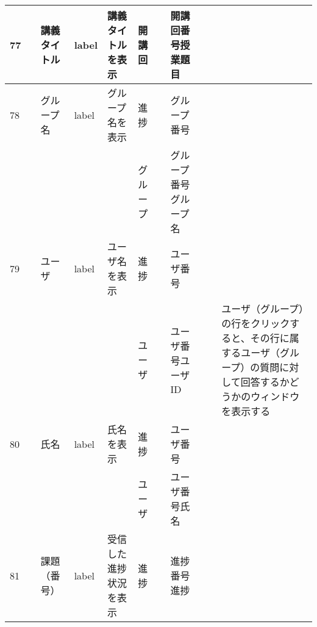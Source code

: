 \begin{landscape}
\begin{table}[]
\begin{tabular}{|l|l|l|l|l|l|l|l|l|l|l|}
77  &               & 講義タイトル           & label    & 講義タイトルを表示                                                         & 開講回     &                       & 開講回番号授業題目          &                 &                               &                                                                \\ \hline
78  &               & グループ名            & label    & グループ名を表示                                                          & 進捗      &                       & グループ番号             &                 &                               &                                                                \\ \hline
    &               &                  &          &                                                                   & グループ    &                       & グループ番号グループ名        &                 &                               &                                                                \\ \hline
79  &               & ユーザ              & label    & ユーザ名を表示                                                           & 進捗      &                       & ユーザ番号              &                 &                               &                                                                \\ \hline
    &               &                  &          &                                                                   & ユーザ     &                       & ユーザ番号ユーザID         &                 &                               & ユーザ（グループ）の行をクリックすると、その行に属するユーザ（グループ）の質問に対して回答するかどうかのウィンドウを表示する \\ \hline
80  &               & 氏名               & label    & 氏名を表示                                                             & 進捗      &                       & ユーザ番号              &                 &                               &                                                                \\ \hline
    &               &                  &          &                                                                   & ユーザ     &                       & ユーザ番号氏名            &                 &                               &                                                                \\ \hline
81  &               & 課題（番号）           & label    & 受信した進捗状況を表示                                                       & 進捗      &                       & 進捗番号進捗             &                 &                               &                                                                \\ \hline

\end{tabular}
\end{table}
\end{landscape}
